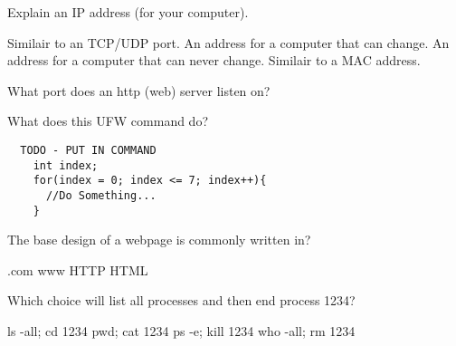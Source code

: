 \documentclass{exam}
\begin{document}
\begin{questions}
    \question Explain an IP address (for your computer). 
    \begin{choices}
      \choice Similair to an TCP/UDP port. 
      \choice An address for a computer that can change.
      \choice An address for a computer that can never change.
      \choice Similair to a MAC address. 
    \end{choices}
  
  \newpage
  \question What port does an http (web) server listen on?
    \begin{choices}
    \end{choices}
  
  \question What does this UFW command do?
  \begin{verbatim}
  TODO - PUT IN COMMAND
    int index;
    for(index = 0; index <= 7; index++){
      //Do Something...
    }
  \end{verbatim}
    \begin{choices}
    \end{choices}
  
  \question The base design of a webpage is commonly written in?
    \begin{choices}
      \choice .com
      \choice www
      \choice HTTP
      \choice HTML
    \end{choices}

  \question Which choice will list all processes and then end process 1234? 
    \begin{choices}
      \choice ls -all; cd 1234
      \choice pwd; cat 1234
      \choice ps -e; kill 1234
      \choice who -all; rm 1234
    \end{choices}
  
  \end{questions}
\end{document}

